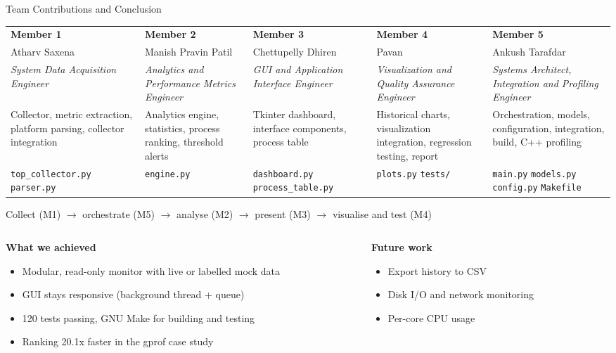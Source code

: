 \documentclass[aspectratio=169,10pt]{beamer}
\begin{document}
\begin{frame}{Team Contributions and Conclusion}
\scriptsize
\setlength{\tabcolsep}{4pt}
\begin{tabular}{|>{\raggedright}p{2.45cm}|>{\raggedright}p{2.45cm}|>{\raggedright}p{2.45cm}|>{\raggedright}p{2.45cm}|>{\raggedright\arraybackslash}p{2.45cm}|}
\hline
\textbf{Member 1} & \textbf{Member 2} & \textbf{Member 3} & \textbf{Member 4} & \textbf{Member 5} \\
Atharv Saxena & Manish Pravin Patil & Chettupelly Dhiren & Pavan & Ankush Tarafdar \\
\hline
\textit{System Data Acquisition Engineer} &
\textit{Analytics and Performance Metrics Engineer} &
\textit{GUI and Application Interface Engineer} &
\textit{Visualization and Quality Assurance Engineer} &
\textit{Systems Architect, Integration and Profiling Engineer} \\
\hline
Collector, metric extraction, platform parsing, collector integration &
Analytics engine, statistics, process ranking, threshold alerts &
Tkinter dashboard, interface components, process table &
Historical charts, visualization integration, regression testing, report &
Orchestration, models, configuration, integration, build, C++ profiling \\
\hline
\texttt{top\_collector.py} \texttt{parser.py} &
\texttt{engine.py} &
\texttt{dashboard.py} \texttt{process\_table.py} &
\texttt{plots.py} \texttt{tests/} &
\texttt{main.py} \texttt{models.py} \texttt{config.py} \texttt{Makefile} \\
\hline
\end{tabular}

\vspace{0.1cm}
\centering
Collect (M1) $\rightarrow$ orchestrate (M5) $\rightarrow$ analyse (M2) $\rightarrow$ present (M3) $\rightarrow$ visualise and test (M4)

\raggedright
\vspace{0.2cm}
\begin{columns}[T]
\begin{column}{0.55\textwidth}
\textbf{\small What we achieved}
\begin{itemize}
  \item Modular, read-only monitor with live or labelled mock data
  \item GUI stays responsive (background thread + queue)
  \item 120 tests passing, GNU Make for building and testing
  \item Ranking 20.1x faster in the gprof case study
\end{itemize}
\end{column}
\begin{column}{0.42\textwidth}
\textbf{\small Future work}
\begin{itemize}
  \item Export history to CSV
  \item Disk I/O and network monitoring
  \item Per-core CPU usage
\end{itemize}
\end{column}
\end{columns}
\end{frame}
\end{document}
